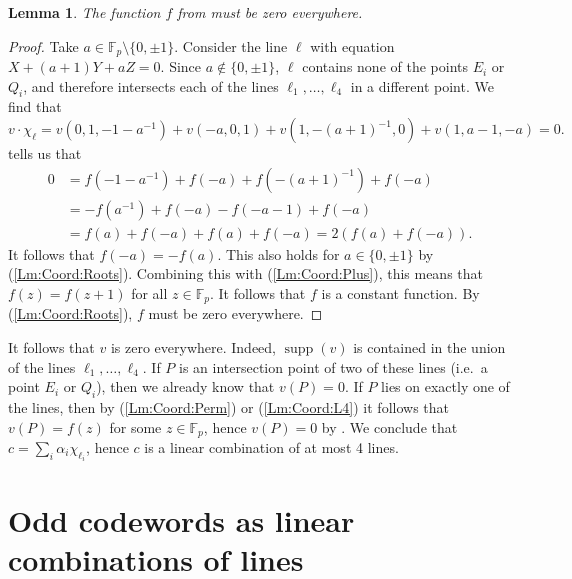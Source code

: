 \documentclass[12pt, a4paper]{article}
\newtheorem{lm}[thm]{Lemma}
\theoremstyle{definition}
\newcommand{\FF}{\mathbb F}
\DeclareMathOperator{\supp}{supp}
\begin{document}
\begin{lm}
 \label{Lm:Zero}
 The function $f$ from  must be zero everywhere.
\end{lm}

\begin{proof}
 Take $a \in \FF_p \setminus \{0,\pm 1\}$.
 Consider the line $\ell$ with equation $X + (a+1)Y + aZ = 0$.
 Since $a \notin \{0,\pm 1\}$, $\ell$ contains none of the points $E_i$ or $Q_i$, and therefore intersects each of the lines $\ell_1, \dots, \ell_4$ in a different point.
 We find that
 \[
  v \cdot \chi_\ell = v(0,1,-1-a^{-1}) + v(-a,0,1) + v(1,-(a+1)^{-1},0) + v(1,a-1,-a) = 0.
 \]
  tells us that
 \begin{align*}
  0 &= f(-1-a^{-1}) + f(-a) + f(-(a+1)^{-1}) + f(-a) \\
  &= -f(a^{-1}) + f(-a) - f(-a-1) + f(-a) \\
  &= f(a) + f(-a) + f(a) + f(-a)
  = 2 (f(a) + f(-a)).
 \end{align*}
 It follows that $f(-a) = -f(a)$.
 This also holds for $a \in \{0, \pm 1\}$ by  (\ref{Lm:Coord:Roots}).
 Combining this with  (\ref{Lm:Coord:Plus}), this means that $f(z) = f(z+1)$ for all $z \in \FF_p$.
 It follows that $f$ is a constant function.
 By  (\ref{Lm:Coord:Roots}), $f$ must be zero everywhere.
\end{proof}

It follows that $v$ is zero everywhere.
Indeed, $\supp(v)$ is contained in the union of the lines $\ell_1, \dots, \ell_4$.
If $P$ is an intersection point of two of these lines (i.e.\ a point $E_i$ or $Q_i$), then we already know that $v(P) = 0$.
If $P$ lies on exactly one of the lines, then by  (\ref{Lm:Coord:Perm}) or (\ref{Lm:Coord:L4}) it follows that $v(P) = f(z)$ for some $z \in \FF_p$, hence $v(P) = 0$ by .
We conclude that $c = \sum_i \alpha_i \chi_{\ell_i}$, hence $c$ is a linear combination of at most 4 lines.

\section{Odd codewords as linear combinations of lines}
 \label{Sec:LinComb}
\end{document}
